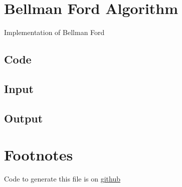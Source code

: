 \documentclass{article}
\begin{document}
    \section{Bellman Ford Algorithm}
    Implementation of Bellman Ford
    \subsection{Code}
    

    \subsection{Input}
    

    \subsection{Output}
    

    \section{Footnotes}
    Code to generate this file is on \href{https://github.com/pranavgade20/algos_complexity_benchmarker}{github}
\end{document}
